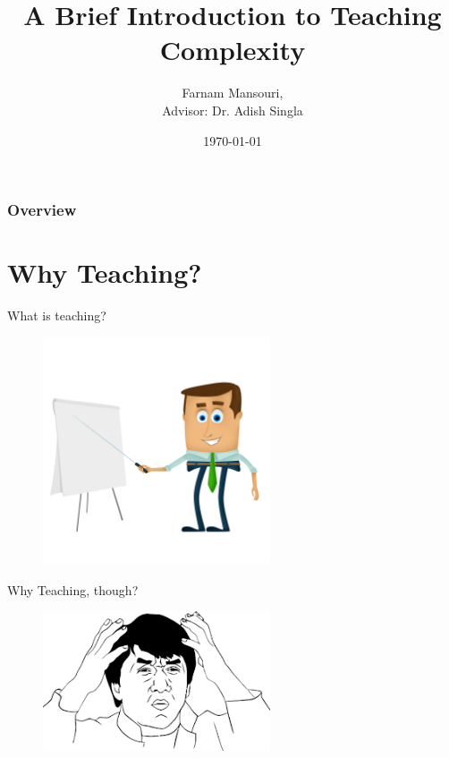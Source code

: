 \documentclass{beamer}
\title[Internha]{A Brief Introduction to Teaching Complexity} %
\author{Farnam Mansouri, \\
Advisor: Dr. Adish Singla} %
\institute[SUT] %
{
Sharif University of Technology \\ %
\medskip
\textit{fmansouri@ce.sharif.edu} %
}
\date{\today} %
\begin{document}
\begin{frame}
\titlepage %
\end{frame}


\begin{frame}
\frametitle{Overview} %
\tableofcontents %
\end{frame}


\section{Why Teaching?}
\begin{frame}{What is teaching?}
    \begin{figure}[t]
    
    \includegraphics[angle = 0, width=0.6\textwidth]{Figures/teacher.png}
    \end{figure}
    
\end{frame}


\begin{frame}{Why Teaching, though?}
    \begin{figure}[t]
    \centering
    \includegraphics[angle = 0, width=0.6\textwidth]{Figures/jackie.png}
    \end{figure}
    
\end{frame}
\end{document}
